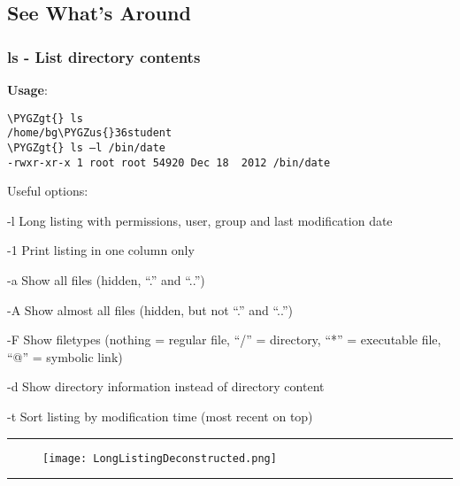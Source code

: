 \documentclass[a4paper,11pt,english]{sphinxmanual}
\def\PYGZus{\char`\_}
\def\PYGZgt{\char`\>}
\begin{document}
\subsection{See What’s Around}
\label{introduction:see-whats-around}

\subsubsection{ls - List directory contents}
\label{introduction:ls-list-directory-contents}\begin{description}
\item[{\textbf{Usage}:}] \leavevmode
{}

\end{description}

\begin{Verbatim}[frame=single, rulecolor=\color{lightgray}, fontfamily=courier, commandchars=\\\{\}]
\PYGZgt{} ls
/home/bg\PYGZus{}36student
\PYGZgt{} ls –l /bin/date
-rwxr-xr-x 1 root root 54920 Dec 18  2012 /bin/date
\end{Verbatim}

Useful options:
\begin{optionlist}{3cm}
\item [-l]  
Long listing with permissions, user, group and last modification date
\item [-1]  
Print listing in one column only
\item [-a]  
Show all files (hidden, “.” and “..”)
\item [-A]  
Show almost all files (hidden, but not “.” and “..”)
\item [-F]  
Show filetypes (nothing = regular file, “/” = directory, “*” = executable file, “@” = symbolic link)
\item [-d]  
Show directory information instead of  directory content
\item [-t]  
Sort listing by modification time (most recent on top)
\end{optionlist}


\bigskip\hrule{}\bigskip

\begin{figure}[htbp]
\centering

\texttt{[image: LongListingDeconstructed.png]}
\end{figure}


\bigskip\hrule{}\bigskip
\end{document}
